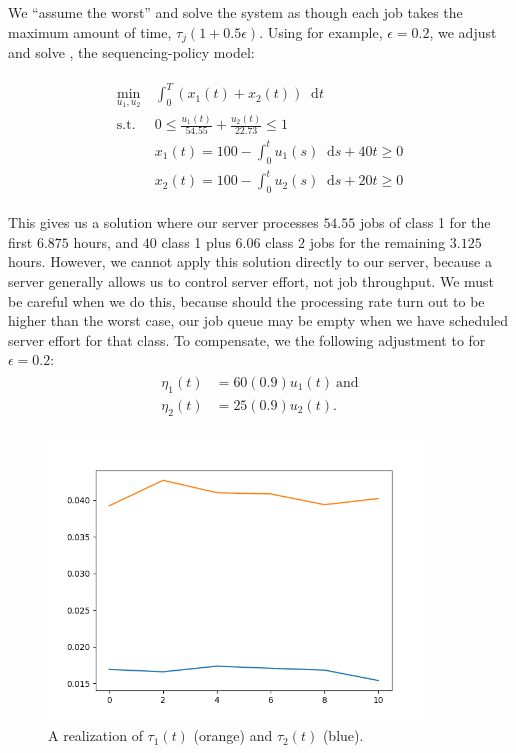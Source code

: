 \documentclass[11pt,a4paper,titlepage]{article}
\newcommand*{\dd}{\ensuremath{\mathop{}\!\mathrm{d}}}%
\theoremstyle{definition}
\theoremstyle{plain}
\begin{document}
    We ``assume the worst'' and solve the system as though each job takes the maximum amount of time,
    $\tau_j (1+ 0.5 \epsilon)$.
    Using for example,
    $\epsilon=0.2$,
    we adjust and solve \modeltwo,
    the sequencing-policy model:

    \begin{align}
        \label{eq:model-2-robust}
        \begin{split}
            \min\limits_{u_1, u_2}
            &~ \int_0^T \left( x_1(t) + x_2(t) \right) \dd t \\
            \text{s.t.}
            &~ 0 \leq \frac{u_1(t)}{54.55} + \frac{u_2(t)}{22.73} \leq 1 \\
            &~ x_1(t) = 100 - \int_0^t u_1(s) \dd s + 40t \geq 0 \\
            &~ x_2(t) = 100 - \int_0^t u_2(s) \dd s + 20t \geq 0
        \end{split}
    \end{align}

    This gives us a solution where our server processes $54.55$
    jobs of class 1 for the first $6.875$ hours,
    and $40$ class 1 plus $6.06$ class 2 jobs for the remaining $3.125$ hours.
    However,
    we cannot apply this solution directly to our server,
    because a server generally allows us to control server effort,
    not job throughput.
    We must be careful when we do this,
    because should the processing rate turn out to be higher than the worst case,
    our job queue may be empty when we have scheduled server effort for that class.
    To compensate,
    we the following adjustment to  for $\epsilon=0.2$:
    \begin{align}
        \label{eq:model-2-translation-robust}
        \begin{split}
            \eta_1(t) & = 60(0.9) u_1(t) ~ \text{and} \\
            \eta_2(t) & = 25(0.9) u_2(t).
        \end{split}
    \end{align}

    \begin{figure}
        \centering
        \includegraphics[width=0.9\textwidth]{tau_t.png}
        \caption{A realization of $\tau_1(t)$ (orange) and $\tau_2(t)$ (blue).}
        \label{fig:tau-realization}
    \end{figure}
\end{document}
